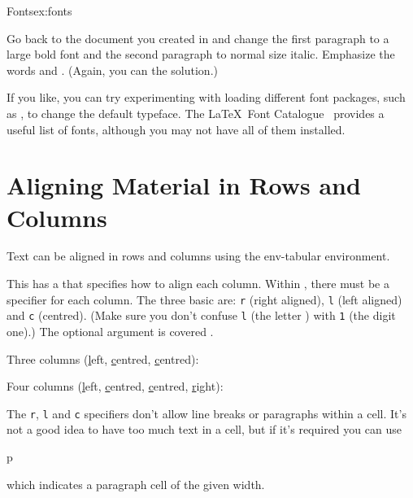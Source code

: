 \begin{exercise}{Fonts}{ex:fonts}

Go back to the document you created in  and
change the first paragraph to a large bold font and the second
paragraph to normal size italic.  Emphasize the words  and
.  (Again, you can  the solution.)

If you like, you can try experimenting with loading
different font packages, such as , to change the
default typeface. The \LaTeX\ Font Catalogue~\cite{fontcat} provides
a useful list of fonts, although you may not have all of them
installed.
\end{exercise}


\section{Aligning Material in Rows and Columns}
\label{sec:tabular}

Text can be aligned in rows and columns using the \gls{env-tabular}
environment.
\begin{definition}
\end{definition}%
This  has a
 
that specifies how to align each column. Within , there must be a specifier for each column. The three
basic are: \texttt{r} (right aligned), \texttt{l} (left aligned) and
\texttt{c} (centred).
(Make sure you don't confuse \texttt{l} (the letter ) with \texttt{1} 
(the digit one).)
The optional argument  is covered 
.

Three columns (\underline{l}eft, \underline{c}entred, \underline{c}entred):
\begin{codeS}
\end{codeS} 

Four columns (\underline{l}eft, \underline{c}entred, \underline{c}entred, \underline{r}ight):
\begin{codeS}
\end{codeS} 

The \texttt{r}, \texttt{l} and \texttt{c} specifiers don't allow
line breaks or paragraphs within a cell. It's not a good idea to
have too much text in a cell, but if it's required you can use
\begin{definition}
p
\end{definition}
which indicates a paragraph cell of the given width.

